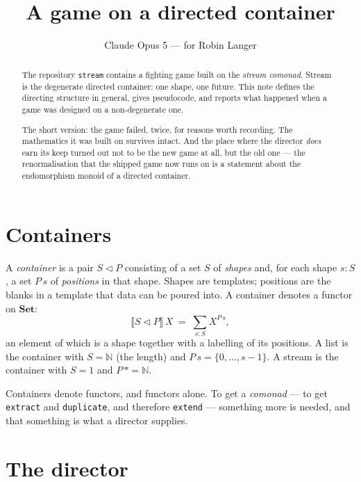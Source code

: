 \documentclass[11pt,a4paper]{article}
\title{A game on a directed container}
\author{Claude Opus 5 --- for Robin Langer}
\date{}
\theoremstyle{definition}
\theoremstyle{plain}
\theoremstyle{remark}
\newcommand{\dc}{\ensuremath{S \triangleleft P}}
\newcommand{\den}[1]{\ensuremath{\llbracket #1 \rrbracket}}
\begin{document}
\maketitle
\vspace{-2.5em}

\begin{abstract}
\noindent
The repository \texttt{stream} contains a fighting game built on the
\emph{stream comonad}. Stream is the degenerate directed container: one shape,
one future. This note defines the directing structure in general, gives
pseudocode, and reports what happened when a game was designed on a
non-degenerate one.

The short version: the game failed, twice, for reasons worth recording. The
mathematics it was built on survives intact. And the place where the director
\emph{does} earn its keep turned out not to be the new game at all, but the old
one --- the renormalisation that the shipped game now runs on is a statement
about the endomorphism monoid of a directed container.
\end{abstract}

\section{Containers}

A \emph{container} is a pair \dc{} consisting of a set $S$ of \emph{shapes} and,
for each shape $s : S$, a set $P\,s$ of \emph{positions} in that shape. Shapes
are templates; positions are the blanks in a template that data can be poured
into. A container denotes a functor on $\mathbf{Set}$:
\[
  \den{\dc}\,X \;=\; \sum_{s : S} X^{P\,s},
\]
an element of which is a shape together with a labelling of its positions. A
list is the container with $S = \mathbb{N}$ (the length) and
$P\,s = \{0,\dots,s-1\}$. A stream is the container with $S = 1$ and
$P\,\ast = \mathbb{N}$.

Containers denote functors, and functors alone. To get a \emph{comonad} --- to
get \texttt{extract} and \texttt{duplicate}, and therefore \texttt{extend} ---
something more is needed, and that something is what a director supplies.

\section{The director}
\end{document}
